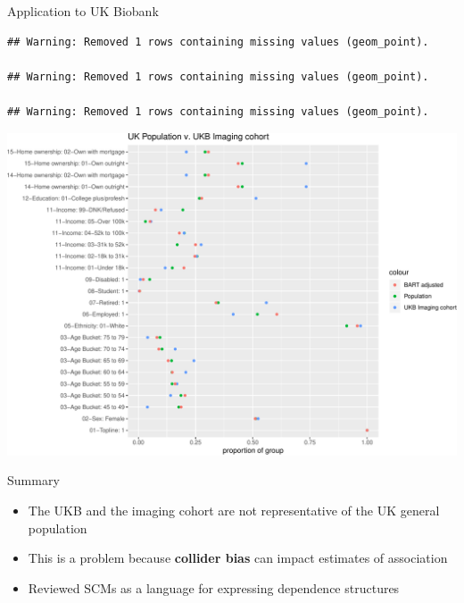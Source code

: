 \documentclass[
  ignorenonframetext,
]{beamer}
\providecommand{\tightlist}{%
  \setlength{\itemsep}{0pt}\setlength{\parskip}{0pt}}
\begin{document}
\begin{frame}[fragile]{Application to UK Biobank}
\protect\hypertarget{application-to-uk-biobank}{}

\begin{verbatim}
## Warning: Removed 1 rows containing missing values (geom_point).

## Warning: Removed 1 rows containing missing values (geom_point).

## Warning: Removed 1 rows containing missing values (geom_point).
\end{verbatim}

\includegraphics{fmrib-deck-20191002_files/figure-beamer/fig-ukb-results-1.pdf}

\end{frame}

\begin{frame}{Summary}
\protect\hypertarget{summary}{}

\begin{itemize}
\tightlist
\item
  The UKB and the imaging cohort are not representative of the UK
  general population
\item
  This is a problem because \textbf{collider bias} can impact estimates
  of association
\item
  Reviewed SCMs as a language for expressing dependence structures
\end{itemize}

\end{frame}
\end{document}
